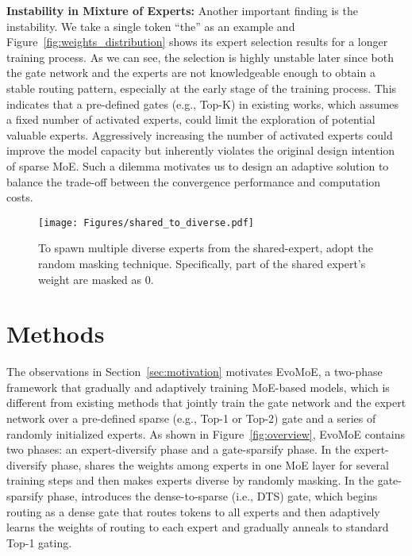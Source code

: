 \textbf{Instability in Mixture of Experts:} Another important finding is the instability. We take a single token ``the'' as an example and Figure~\ref{fig:weights_distribution} shows its expert selection results for a longer training process. As we can see, the selection is highly unstable later since both the gate network and the experts are not knowledgeable enough to obtain a stable routing pattern, especially at the early stage of the training process. This indicates that a pre-defined gates (e.g., Top-K) in existing works, which assumes a fixed number of activated experts, could limit the exploration of potential valuable experts. Aggressively increasing the number of activated experts could improve the model capacity but inherently violates the original design intention of sparse MoE. Such a dilemma motivates us to design an adaptive solution to balance the trade-off between the convergence performance and computation costs.

\begin{figure}[t]
    \centering
    \texttt{[image: Figures/shared\_to\_diverse.pdf]}
    \caption{
    To spawn multiple diverse experts from the shared-expert, \ourmethods{} adopt the random masking technique. Specifically, 
    part of the shared expert's weight are masked as 0.}
    \label{fig:shared_to_diverse}
\end{figure}

\section{Methods}
\label{sec:methods}
The observations in Section~\ref{sec:motivation} motivates EvoMoE, a two-phase framework that gradually and adaptively training MoE-based models, which is different from existing methods that jointly train the gate network and the expert network over a pre-defined sparse (e.g., Top-1 or Top-2) gate and a series of randomly initialized experts.
As shown in Figure~\ref{fig:overview}, EvoMoE contains two phases: an expert-diversify phase and a gate-sparsify phase.
In the expert-diversify phase, \ourmethods{} shares the weights among experts in one MoE layer for several training steps and then makes experts diverse by randomly masking.  
In the gate-sparsify phase, \ourmethods{} introduces the dense-to-sparse (i.e., DTS) gate, which begins routing as a dense gate that routes tokens to all experts and then adaptively learns the weights of routing to each expert and gradually anneals to standard Top-1 gating.

